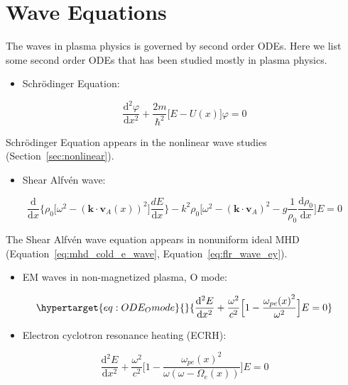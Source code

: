 \documentclass[
  notoc %
]{tufte-book}
\providecommand{\tightlist}{%
  \setlength{\itemsep}{0pt}\setlength{\parskip}{0pt}
}
\begin{document}
\hypertarget{sec:WKB}{%
\section{Wave Equations}\label{sec:WKB}}

The waves in plasma physics is governed by second order ODEs. Here we
list some second order ODEs that has been studied mostly in plasma
physics.

\begin{itemize}
\tightlist
\item
  Schrödinger Equation:
\end{itemize}

\[
\frac{\mathrm{d}^2\varphi}{\mathrm{d}x^2} + \frac{2m}{\hbar^2}\big[ E-U(x)\big]\varphi= 0
\]

Schrödinger Equation appears in the nonlinear wave studies
(Section~\ref{sec:nonlinear}).

\begin{itemize}
\tightlist
\item
  Shear Alfvén wave:
\end{itemize}

\[
\frac{\mathrm{d}}{\mathrm{d}x}\Big\{ \rho_0 \big[ \omega^2 - (\mathbf{k}\cdot\mathbf{v}_A(x))^2 \big]\frac{dE}{\mathrm{d}x} \Big\} - k^2\rho_0 \big[ \omega^2 - (\mathbf{k}\cdot\mathbf{v}_A)^2 - g\frac{1}{\rho_0}\frac{\mathrm{d}\rho_0}{\mathrm{d}x} \big]E = 0
\]

The Shear Alfvén wave equation appears in nonuniform ideal MHD
(Equation~\ref{eq:mhd_cold_e_wave}, Equation~\ref{eq:flr_wave_ey}).

\begin{itemize}
\tightlist
\item
  EM waves in non-magnetized plasma, O mode:
\end{itemize}

\begin{equation}\protect\hypertarget{eq:ODE_Omode}{}{
\frac{\mathrm{d}^2 E}{\mathrm{d}x^2} + \frac{\omega^2}{c^2} \Big[ 1-\frac{{\omega_{pe}(x)}^2}{\omega^2} \Big]E = 0
}\label{eq:ODE_Omode}\end{equation}

\begin{itemize}
\tightlist
\item
  Electron cyclotron resonance heating (ECRH):
\end{itemize}

\[
\frac{\mathrm{d}^2 E}{\mathrm{d}x^2} + \frac{\omega^2}{c^2} \Big[ 1-\frac{{\omega_{pe}(x)}^2}{\omega(\omega-\Omega_e(x))} \Big]E = 0
\]
\end{document}
